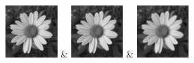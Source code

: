 \begin{table}[h!]
\begin{tabular}
        \includegraphics[width=2cm]{images/processed/flower/gaussian_3x3_sigma2.0/blurred.png} &
        \includegraphics[width=2cm]{images/processed/flower/gaussian_5x5_sigma1.0/blurred.png} &
        \includegraphics[width=2cm]{images/processed/flower/gaussian_5x5_sigma2.0/blurred.png}                                                                                                                                                                                                 \\
    \end{tabular}
\end{table}

